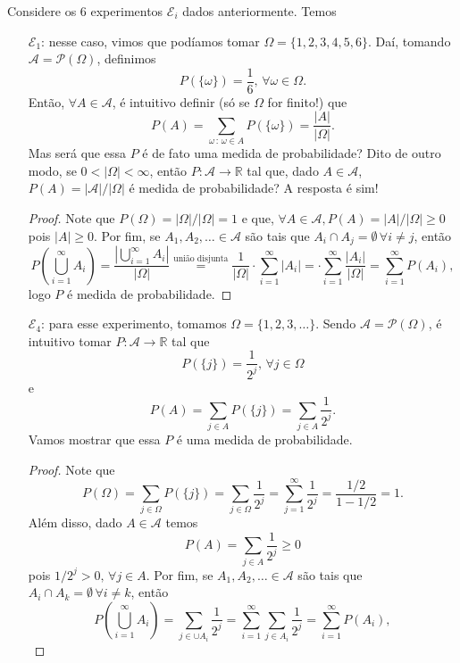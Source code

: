\documentclass[../Notas.tex]{subfiles}
\begin{document}
\begin{example}
Considere os 6 experimentos $\mathcal{E}_i$ dados anteriormente. Temos
\begin{itemize}
    \item[$\mathcal{E}_1$:] nesse caso, vimos que podíamos tomar $\Omega = \{1,2,3,4,5,6 \}$. Daí, tomando $\mathcal{A} = \mathcal{P}(\Omega)$, definimos
    $$
    P(\{ \omega \}) = \frac{1}{6}, \, \forall \omega\in\Omega.
    $$
    Então, $\forall A\in\mathcal{A}$, é intuitivo definir (só se $\Omega$ for finito!) que
    $$
    P(A) = \sum_{\omega \, : \, \omega\in A} P(\{ \omega \}) = \frac{|A|}{|\Omega|}.
    $$
    Mas será que essa $P$ é de fato uma medida de probabilidade? Dito de outro modo, se $0 < |\Omega| < \infty$, então $P:\mathcal{A} \to\mathbb{R}$ tal que, dado $A\in\mathcal{A}$, $P(A) = |\mathcal{A}|/|\Omega|$ é medida de probabilidade? A resposta é sim!
    \begin{proof}
    Note que $P(\Omega) = |\Omega|/|\Omega| = 1$ e que, $\forall A\in\mathcal{A}, P(A) = |A|/|\Omega| \geq 0$ pois $|A| \geq 0$. Por fim, se $A_1, A_2, \dots \in\mathcal{A}$ são tais que $A_i\cap A_j = \emptyset \, \forall i\neq j$, então
    $$
    P\left( \bigcup_{i=1}^{\infty} A_i \right) = \frac{\left| \displaystyle{\bigcup_{i=1}^{\infty}A_i} \right|}{|\Omega|} \stackrel{\text{união disjunta}}{=} \frac{1}{|\Omega|}\cdot\sum_{i=1}^{\infty} |A_i| = \cdot\sum_{i=1}^{\infty} \frac{|A_i|}{|\Omega|} = \sum_{i=1}^{\infty} P(A_i),
    $$
    logo $P$ é medida de probabilidade.
    \end{proof}
    \item[$\mathcal{E}_4$:] para esse experimento, tomamos $\Omega = \{ 1, 2, 3, \dots \}$. Sendo $\mathcal{A} = \mathcal{P}(\Omega)$, é intuitivo tomar $P:\mathcal{A}\to\mathbb{R}$ tal que
    $$
    P(\{j\}) = \frac{1}{2^j}, \, \forall j\in\Omega 
    $$
    e
    $$
    P(A) = \sum_{j\in A} P(\{j\}) = \sum_{j\in A}\frac{1}{2^j}.
    $$
    Vamos mostrar que essa $P$ é uma medida de probabilidade.
    \begin{proof}
    Note que 
    $$
    P(\Omega) = \sum_{j\in\Omega} P(\{j\}) = \sum_{j\in\Omega}\frac{1}{2^j} = \sum_{j=1}^{\infty}\frac{1}{2^j} = \frac{1/2}{1 - 1/2} = 1.
    $$
    Além disso, dado $A\in\mathcal{A}$ temos 
    $$
    P(A) = \sum_{j\in A}\frac{1}{2^j} \geq 0
    $$
    pois $1/2^j > 0, \, \forall j\in A$. Por fim, se $A_1, A_2, \dots \in\mathcal{A}$ são tais que $A_i\cap A_k = \emptyset \, \forall i\neq k$, então
    $$
    P\left( \bigcup_{i=1}^{\infty}A_i \right) = \sum_{j\in \cup A_i }\frac{1}{2^j} = \sum_{i=1}^{\infty} \sum_{j\in A_i}\frac{1}{2^j} = \sum_{i=1}^{\infty}P(A_i),
$$
\end{proof}
\end{itemize}
\end{example}
\end{document}
